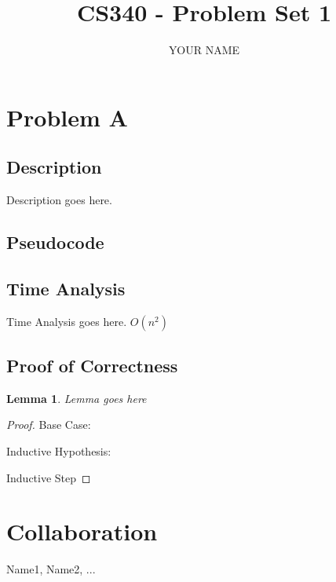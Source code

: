 \documentclass[11pt, oneside]{article}   	%
\title{CS340 - Problem Set 1}
\author{YOUR NAME}
\newtheorem*{lemma}{Lemma}
\begin{document}
\maketitle

\section{Problem A}
\subsection{Description}
Description goes here.

\subsection{Pseudocode}
\begin{algorithm}
\end{algorithm}

\subsection{Time Analysis}
Time Analysis goes here. $O(n^2)$


\subsection{Proof of Correctness}
\begin{lemma}
Lemma goes here
\end{lemma}

\begin{proof}
Base Case:

Inductive Hypothesis:

Inductive Step
\end{proof}

\section*{Collaboration}
Name1, Name2, ...
\end{document}

